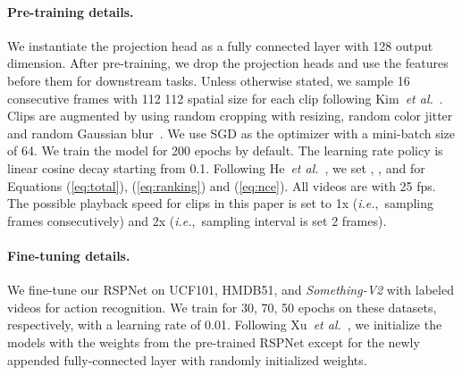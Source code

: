 \documentclass[final]{cvpr}
\def\etal{{\em et al.\/}\, }
\def\ie{\mbox{\textit{i.e.}, }}
\begin{document}
\paragraph{Pre-training details.}
We instantiate the projection head as a fully connected layer with 128 output dimension. After pre-training, we drop the projection heads and use the features before them for downstream tasks.
Unless otherwise stated, we sample 16 consecutive frames with 112  112 spatial size for each clip following Kim~\etal\cite{3dpuzzle}.
Clips are augmented by using random cropping with resizing, random color jitter and random Gaussian blur~\cite{chen2020simple}.
We use SGD as the optimizer with a mini-batch size of 64. We train the model for 200 epochs by default.
The learning rate policy is linear cosine decay starting from 0.1.
Following He~\etal\cite{he2019momentum}, we set , ,  and  for Equations  (\ref{eq:total}), (\ref{eq:ranking}) and (\ref{eq:nce}). 
All videos are with 25 fps.
The possible playback speed  for clips in this paper is set to 1x (\ie sampling frames consecutively) and 2x (\ie sampling interval is set 2 frames).


\paragraph{Fine-tuning details.}
We fine-tune our RSPNet on UCF101, HMDB51, and \emph{Something-V2} with labeled videos for action recognition. We train for 30, 70, 50 epochs on these datasets, respectively, with a learning rate of 0.01. Following Xu~\etal\cite{xu2019self}, we initialize the models with the weights from the pre-trained RSPNet except for the newly appended fully-connected layer with randomly initialized weights.
\end{document}
